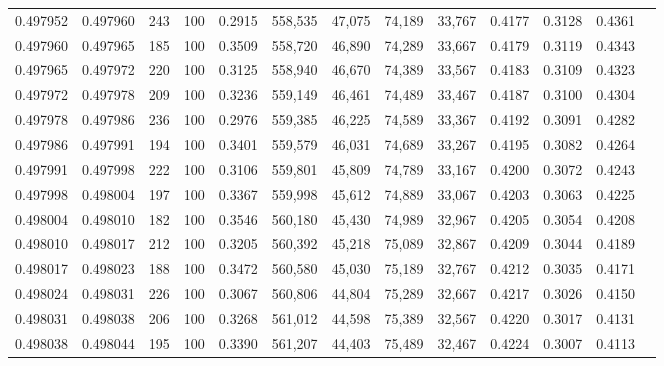 \begin{tabular}{rrrrrrrrrrrrr}
0.497952 & 0.497960 &   243 & 100 &                                     0.2915 & 558,535 &  47,075 &  74,189 &  33,767 & 0.4177 & 0.3128 & 0.4361 \\
0.497960 & 0.497965 &   185 & 100 &                                     0.3509 & 558,720 &  46,890 &  74,289 &  33,667 & 0.4179 & 0.3119 & 0.4343 \\
0.497965 & 0.497972 &   220 & 100 &                                     0.3125 & 558,940 &  46,670 &  74,389 &  33,567 & 0.4183 & 0.3109 & 0.4323 \\
0.497972 & 0.497978 &   209 & 100 &                                     0.3236 & 559,149 &  46,461 &  74,489 &  33,467 & 0.4187 & 0.3100 & 0.4304 \\
0.497978 & 0.497986 &   236 & 100 &                                     0.2976 & 559,385 &  46,225 &  74,589 &  33,367 & 0.4192 & 0.3091 & 0.4282 \\
0.497986 & 0.497991 &   194 & 100 &                                     0.3401 & 559,579 &  46,031 &  74,689 &  33,267 & 0.4195 & 0.3082 & 0.4264 \\
0.497991 & 0.497998 &   222 & 100 &                                     0.3106 & 559,801 &  45,809 &  74,789 &  33,167 & 0.4200 & 0.3072 & 0.4243 \\
0.497998 & 0.498004 &   197 & 100 &                                     0.3367 & 559,998 &  45,612 &  74,889 &  33,067 & 0.4203 & 0.3063 & 0.4225 \\
0.498004 & 0.498010 &   182 & 100 &                                     0.3546 & 560,180 &  45,430 &  74,989 &  32,967 & 0.4205 & 0.3054 & 0.4208 \\
0.498010 & 0.498017 &   212 & 100 &                                     0.3205 & 560,392 &  45,218 &  75,089 &  32,867 & 0.4209 & 0.3044 & 0.4189 \\
0.498017 & 0.498023 &   188 & 100 &                                     0.3472 & 560,580 &  45,030 &  75,189 &  32,767 & 0.4212 & 0.3035 & 0.4171 \\
0.498024 & 0.498031 &   226 & 100 &                                     0.3067 & 560,806 &  44,804 &  75,289 &  32,667 & 0.4217 & 0.3026 & 0.4150 \\
0.498031 & 0.498038 &   206 & 100 &                                     0.3268 & 561,012 &  44,598 &  75,389 &  32,567 & 0.4220 & 0.3017 & 0.4131 \\
0.498038 & 0.498044 &   195 & 100 &                                     0.3390 & 561,207 &  44,403 &  75,489 &  32,467 & 0.4224 & 0.3007 & 0.4113 \\

\end{tabular}
